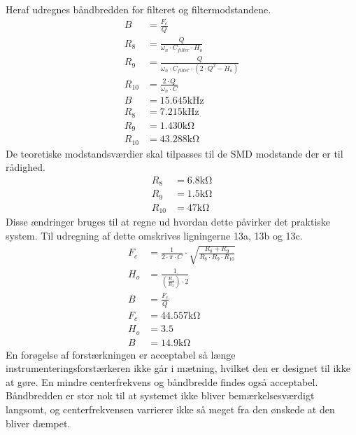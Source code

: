Heraf udregnes båndbredden for filteret og filtermodstandene. \cite[Side. 209]{Huelsman1993}
\begin{align}
	B & = \frac{F_c}{Q} \\
	R_8 & = \frac{Q}{\omega_n \cdot C_{filter} \cdot H_o } \\
	R_9 & = \frac{Q}{ \omega_n \cdot C_{filter} \cdot \left( 2 \cdot Q^2 - H_o \right) } \\
	R_{10} & = \frac{2 \cdot Q}{ \omega_n \cdot C} \\
	B & = 15.645 \si{\kilo\hertz} \nonumber \\
	R_8 & = 7.215 \si{\kilo\hertz} \nonumber \\
	R_9 & = 1.430 \si{\kilo\ohm} \nonumber \\
	R_{10} & = 43.288 \si{\kilo\ohm} \nonumber 
\end{align}
De teoretiske modstandsværdier skal tilpasses til de SMD modstande der er til rådighed.
\begin{align}
	R_8 & = 6.8 \si{\kilo\ohm} \nonumber \\
	R_9 & = 1.5 \si{\kilo\ohm} \nonumber \\
	R_{10} & = 47 \si{\kilo\ohm} \nonumber
\end{align}
Disse ændringer bruges til at regne ud hvordan dette påvirker det praktiske system. Til udregning af dette omskrives ligningerne 13a, 13b og 13c. \cite[Side. 208]{Huelsman1993}
\begin{align}
	F_c & = \frac{1}{2 \cdot \pi \cdot C} \cdot \sqrt{\frac{R_8+R_9}{R_8 \cdot R_9 \cdot R_{10}}} \\
	H_o & = \frac{1}{\left( \frac{R_1}{R_3} \right) \cdot 2} \\
	B & = \frac{F_c}{Q} \\
	F_c & = 44.557 \si{\kilo\ohm} \nonumber \\
	H_o & = 3.5 \nonumber \\
	B & = 14.9 \si{\kilo\ohm} \nonumber
\end{align}
En forøgelse af forstærkningen er acceptabel så længe instrumenteringsforstærkeren ikke går i mætning, hvilket den er designet til ikke at gøre. En mindre centerfrekvens og båndbredde findes også acceptabel. Båndbredden er stor nok til at systemet ikke bliver bemærkelsesværdigt langsomt, og centerfrekvensen varrierer ikke så meget fra den ønskede at den bliver dæmpet.
